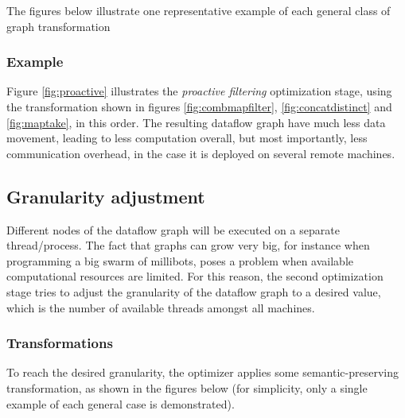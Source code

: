 \documentclass[sigplan,review,anonymous]{acmart}\settopmatter{printfolios=true}
\begin{document}
The figures below illustrate one representative example of each general class of graph transformation


\newpage
\subsubsection{Example}

Figure \ref{fig:proactive} illustrates the \textit{proactive filtering} optimization stage, using the transformation shown in figures \ref{fig:combmapfilter}, \ref{fig:concatdistinct} and \ref{fig:maptake}, in this order. The resulting dataflow graph have much less data movement, leading to less computation overall, but most importantly, less communication overhead, in the case it is deployed on several remote machines.


\subsection{Granularity adjustment}

Different nodes of the dataflow graph will be executed on a separate thread/process. The fact that graphs can grow very big, for instance when programming a big swarm of millibots\cite{army}, poses a problem when available computational resources are limited. For this reason, the second optimization stage tries to adjust the granularity of the dataflow graph to a desired value, which is the number of available threads amongst all machines. 

\subsubsection{Transformations}

To reach the desired granularity, the optimizer applies some semantic-preserving transformation, as shown in the figures below (for simplicity, only a single example of each general case is demonstrated). 

\end{document}

